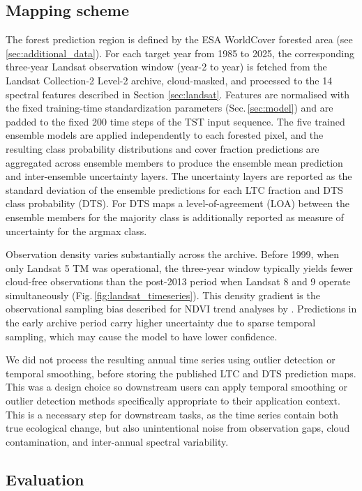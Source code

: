 \documentclass[essd, manuscript]{copernicus}
\begin{document}
\subsection{Mapping scheme}
\label{sec:mapping}
The forest prediction region is defined by the ESA WorldCover forested area (see \ref{sec:additional_data}). For each target year from 1985 to 2025, the corresponding three-year Landsat observation window (year-2 to year) is fetched from the Landsat Collection-2 Level-2 archive, cloud-masked, and processed to the 14 spectral features described in Section \ref{sec:landsat}. Features are normalised with the fixed training-time standardization parameters (Sec.\,\ref{sec:model}) and are padded to the fixed 200 time steps of the TST input sequence. The five trained ensemble models are applied independently to each forested pixel, and the resulting class probability distributions and cover fraction predictions are aggregated across ensemble members to produce the ensemble mean prediction and inter-ensemble uncertainty layers. The uncertainty layers are reported as the standard deviation of the ensemble predictions for each LTC fraction and DTS class probability (DTS). For DTS maps a level-of-agreement (LOA) between the ensemble members for the majority class is additionally reported as measure of uncertainty for the argmax class.

Observation density varies substantially across the archive. Before 1999, when only Landsat 5 TM was operational, the three-year window typically yields fewer cloud-free observations than the post-2013 period when Landsat 8 and 9 operate simultaneously (Fig.\,\ref{fig:landsat_timeseries}). This density gradient is the observational sampling bias described for NDVI trend analyses by \citet{bayle_landsat-based_2024}. Predictions in the early archive period carry higher uncertainty due to sparse temporal sampling, which may cause the model to have lower confidence.

We did not process the resulting annual time series using outlier detection or temporal smoothing, before storing the published LTC and DTS prediction maps. This was a design choice so downstream users can apply temporal smoothing or outlier detection methods specifically appropriate to their application context. This is a necessary step for downstream tasks, as the time series contain both true ecological change, but also unintentional noise from observation gaps, cloud contamination, and inter-annual spectral variability. 

\subsection{Evaluation}
\label{sec:evaluation}
\end{document}
